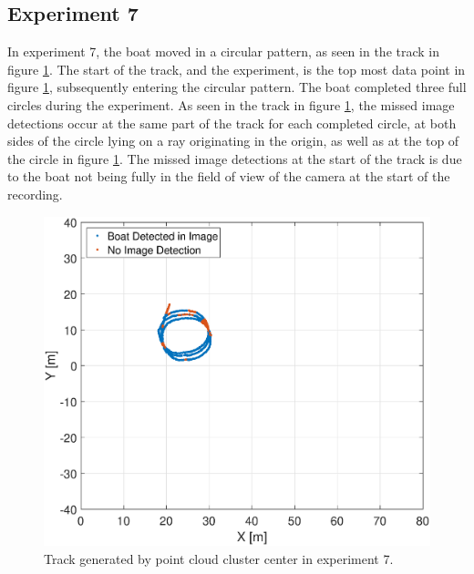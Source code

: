 \subsection{Experiment 7}
In experiment 7, the boat moved in a circular pattern, as seen in the track in figure \ref{fig:ex7_track}. The start of the track, and the experiment, is the top most data point in figure \ref{fig:ex7_track}, subsequently entering the circular pattern. The boat completed three full circles during the experiment. As seen in the track in figure \ref{fig:ex7_track}, the missed image detections occur at the same part of the track for each completed circle, at both sides of the circle lying on a ray originating in the origin, as well as at the top of the circle in figure \ref{fig:ex7_track}. The missed image detections at the start of the track is due to the boat not being fully in the field of view of the camera at the start of the recording.
\begin{figure}[!htb]
	\centering
	\includegraphics[width=.8\linewidth]{fig/exp_7_track.eps}
	\caption{Track generated by point cloud cluster center in experiment 7.}
	\label{fig:ex7_track}
\end{figure}

